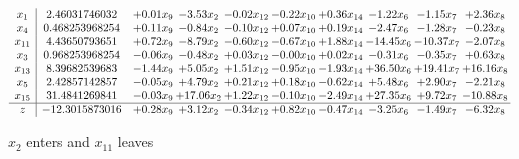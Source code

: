 \documentclass[9pt]{article}
\begin{document}
 \[\begin{array}{c| c c@{\hskip 2pt} c@{\hskip 2pt} c@{\hskip 2pt} c@{\hskip 2pt} c@{\hskip 2pt} c@{\hskip 2pt} c@{\hskip 2pt} c@{\hskip 2pt} }
 x_{1}   &  2.46031746032 & +  0.01 x_{9} & -3.53 x_{2} & -0.02 x_{12} & -0.22 x_{10} & +  0.36 x_{14} & -1.22 x_{6} & -1.15 x_{7} & +  2.36 x_{8}\\
 x_{4}   &  0.468253968254 & +  0.11 x_{9} & -0.84 x_{2} & -0.10 x_{12} & +  0.07 x_{10} & +  0.19 x_{14} & -2.47 x_{6} & -1.28 x_{7} & -0.23 x_{8}\\
 x_{11}   &  4.43650793651 & +  0.72 x_{9} & -8.79 x_{2} & -0.60 x_{12} & -0.67 x_{10} & +  1.88 x_{14} & -14.45 x_{6} & -10.37 x_{7} & -2.07 x_{8}\\
 x_{3}   &  0.968253968254 & -0.06 x_{9} & -0.48 x_{2} & +  0.03 x_{12} & -0.00 x_{10} & +  0.02 x_{14} & -0.31 x_{6} & -0.35 x_{7} & +  0.63 x_{8}\\
 x_{13}   &  8.39682539683 & -1.44 x_{9} & +  5.05 x_{2} & +  1.51 x_{12} & -0.95 x_{10} & -1.93 x_{14} & + 36.50 x_{6} & + 19.41 x_{7} & + 16.16 x_{8}\\
 x_{5}   &  2.42857142857 & -0.05 x_{9} & +  4.79 x_{2} & +  0.21 x_{12} & +  0.18 x_{10} & -0.62 x_{14} & +  5.48 x_{6} & +  2.90 x_{7} & -2.21 x_{8}\\
 x_{15}   &  31.4841269841 & -0.03 x_{9} & + 17.06 x_{2} & +  1.22 x_{12} & -0.10 x_{10} & -2.49 x_{14} & + 27.35 x_{6} & +  9.72 x_{7} & -10.88 x_{8}\\
\hline
z    &  -12.3015873016 & +  0.28 x_{9} & +  3.12 x_{2} & -0.34 x_{12} & +  0.82 x_{10} & -0.47 x_{14} & -3.25 x_{6} & -1.49 x_{7} & -6.32 x_{8}\\
\end{array}\]


 $ x_{2} $ enters and $ x_{11} $ leaves 
\end{document}
